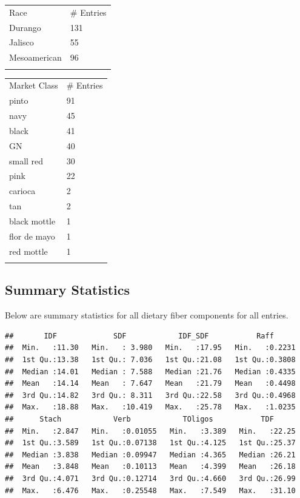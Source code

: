 \documentclass[11pt,]{article}
\begin{document}
\begin{longtable}[c]{@{}ll@{}}
\toprule\addlinespace
Race & \# Entries
\\\addlinespace
\midrule\endhead
Durango & 131
\\\addlinespace
Jalisco & 55
\\\addlinespace
Mesoamerican & 96
\\\addlinespace
\bottomrule
\end{longtable}

\begin{longtable}[c]{@{}ll@{}}
\toprule\addlinespace
Market Class & \# Entries
\\\addlinespace
\midrule\endhead
pinto & 91
\\\addlinespace
navy & 45
\\\addlinespace
black & 41
\\\addlinespace
GN & 40
\\\addlinespace
small red & 30
\\\addlinespace
pink & 22
\\\addlinespace
carioca & 2
\\\addlinespace
tan & 2
\\\addlinespace
black mottle & 1
\\\addlinespace
flor de mayo & 1
\\\addlinespace
red mottle & 1
\\\addlinespace
\bottomrule
\end{longtable}

\subsection{Summary Statistics}\label{summary-statistics}

Below are summary statistics for all dietary fiber components for all
entries.

\begin{verbatim}
##       IDF             SDF            IDF_SDF           Raff       
##  Min.   :11.30   Min.   : 3.980   Min.   :17.95   Min.   :0.2231  
##  1st Qu.:13.38   1st Qu.: 7.036   1st Qu.:21.08   1st Qu.:0.3808  
##  Median :14.01   Median : 7.588   Median :21.76   Median :0.4335  
##  Mean   :14.14   Mean   : 7.647   Mean   :21.79   Mean   :0.4498  
##  3rd Qu.:14.82   3rd Qu.: 8.311   3rd Qu.:22.58   3rd Qu.:0.4968  
##  Max.   :18.88   Max.   :10.419   Max.   :25.78   Max.   :1.0235  
##      Stach            Verb            TOligos           TDF       
##  Min.   :2.847   Min.   :0.01055   Min.   :3.389   Min.   :22.25  
##  1st Qu.:3.589   1st Qu.:0.07138   1st Qu.:4.125   1st Qu.:25.37  
##  Median :3.838   Median :0.09947   Median :4.365   Median :26.21  
##  Mean   :3.848   Mean   :0.10113   Mean   :4.399   Mean   :26.18  
##  3rd Qu.:4.071   3rd Qu.:0.12714   3rd Qu.:4.660   3rd Qu.:26.99  
##  Max.   :6.476   Max.   :0.25548   Max.   :7.549   Max.   :31.10
\end{verbatim}
\end{document}
